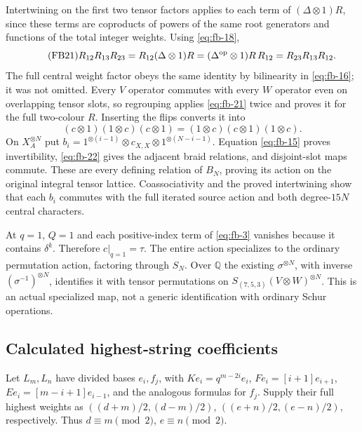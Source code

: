 Intertwining on the first two tensor factors applies to each term of
\((\Delta\otimes1)R\), since these terms are coproducts of powers of
the same root generators and functions of the total integer weights.
Using \eqref{eq:fb-18},
\begin{equation}\tag{FB21}\label{eq:fb-21}
R_{12}R_{13}R_{23}
 =R_{12}(\Delta\otimes1)R
 =(\Delta^{\rm op}\otimes1)R\,R_{12}
 =R_{23}R_{13}R_{12}.
\end{equation}
The full central weight factor obeys the same identity by bilinearity
in \eqref{eq:fb-16}; it was not omitted. Every \(V\) operator commutes with every
\(W\) operator even on overlapping tensor slots, so regrouping applies
\eqref{eq:fb-21} twice and proves it for the full two-colour \(R\). Inserting the
flips converts it into
\begin{equation}\tag{FB22}\label{eq:fb-22}
(c\otimes1)(1\otimes c)(c\otimes1)
 =(1\otimes c)(c\otimes1)(1\otimes c).
\end{equation}
On \(X_A^{\otimes N}\) put
\(b_i=1^{\otimes(i-1)}\otimes c_{X,X}\otimes
1^{\otimes(N-i-1)}\). Equation \eqref{eq:fb-15} proves invertibility, \eqref{eq:fb-22} gives
the adjacent braid relations, and disjoint-slot maps commute. These
are every defining relation of \(B_N\), proving its action on the
original integral tensor lattice. Coassociativity and the proved
intertwining show that each \(b_i\) commutes with the full iterated
source action and both degree-\(15N\) central characters.

At \(q=1\), \(Q=1\) and each positive-index term of \eqref{eq:fb-3} vanishes
because it contains \(\delta^k\). Therefore \(c|_{q=1}=\tau\).
The entire action specializes to the ordinary permutation action,
factoring through \(S_N\). Over \(\mathbb Q\) the existing
\(\sigma^{\otimes N}\), with inverse \((\sigma^{-1})^{\otimes N}\),
identifies it with tensor permutations on
\(S_{(7,5,3)}(V\otimes W)^{\otimes N}\). This is an actual specialized
map, not a generic identification with ordinary Schur operations.

\subsection{Calculated highest-string coefficients}
\label{sec:fb-coefficients}

Let \(L_m,L_n\) have divided bases \(e_i,f_j\), with
\(Ke_i=q^{m-2i}e_i\), \(Fe_i=[i+1]e_{i+1}\),
\(Ee_i=[m-i+1]e_{i-1}\), and the analogous formulas for \(f_j\).
Supply their full highest weights as
\(((d+m)/2,(d-m)/2)\), \(((e+n)/2,(e-n)/2)\), respectively.
Thus \(d\equiv m\pmod2\), \(e\equiv n\pmod2\).

